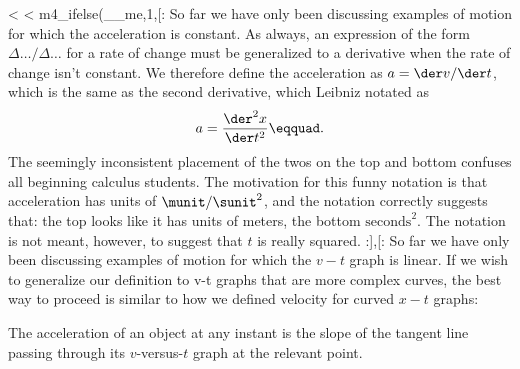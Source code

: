 <%
<%
m4_ifelse(__me,1,[:
So far we have only been discussing examples of motion for
which the acceleration is constant. As always, an expression of the
form $\Delta\ldots/\Delta\ldots$ for a rate of change must be generalized
to a derivative when the rate of change isn't constant. We therefore define
the acceleration as $a=\der v/\der t$, which is the same as the second
derivative, which Leibniz notated as
\begin{equation*}
  a = \frac{\der^2 x}{\der t^2}\eqquad.
\end{equation*}
The seemingly inconsistent placement of the twos on the top
and bottom confuses all beginning calculus students. The
motivation for this funny notation is that acceleration has
units of $\munit/\sunit^2$, and the notation correctly suggests that:
the top looks like it has units of meters, the bottom
$\text{seconds}^2$. The notation is not meant, however, to suggest
that $t$ is really squared.
:],[:%
So far we have only been discussing examples of motion for
which the $v-t$ graph is linear. If we wish to generalize
our definition to v-t graphs that are more complex curves,
the best way to proceed is similar to how we defined
velocity for curved $x-t$ graphs:

\begin{lessimportant}
The acceleration of an object at any instant is the slope of
the tangent line passing through its $v$-versus-$t$ graph
at the relevant point.
\end{lessimportant}

